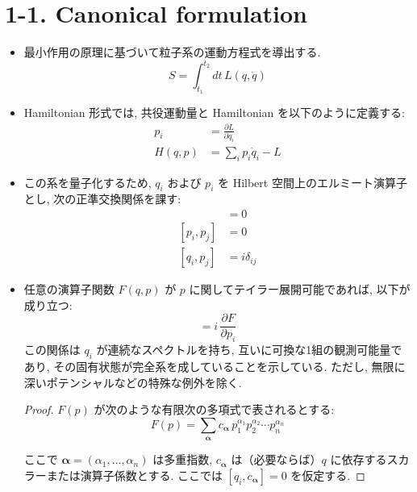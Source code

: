 \documentclass[a4paper,12pt]{article}
\begin{document}
\section*{1-1. Canonical formulation}

\begin{itemize}

    \item 最小作用の原理に基づいて粒子系の運動方程式を導出する.
      \begin{equation*}
      S = \int_{t_1}^{t_2} dt\, L(q, \dot{q}) \tag{1.1}
      \end{equation*}
    
    \item Hamiltonian 形式では, 共役運動量と Hamiltonian を以下のように定義する:
      \begin{align*}
      p_i &= \frac{\partial L}{\partial \dot{q}_i} \tag{1.2} \\
      H(q, p) &= \sum_i p_i \dot{q}_i - L 
      \end{align*}
    
    \item この系を量子化するため, $q_i$ および $p_i$ を Hilbert 空間上のエルミート演算子とし, 次の正準交換関係を課す:
      \begin{align*}
      [q_i, q_j] &= 0 \\
      [p_i, p_j] &= 0 \\
      [q_i, p_j] &= i \delta_{ij} \tag{1.3}
      \end{align*}
    
    \item 任意の演算子関数 $F(q, p)$ が $p$ に関してテイラー展開可能であれば, 以下が成り立つ:
      \begin{equation*}
      [q_i, F] = i\, \frac{\partial F}{\partial p_i} \tag{1.4}
      \end{equation*}
    この関係は $q_i$ が連続なスペクトルを持ち, 互いに可換な1組の観測可能量であり, その固有状態が完全系を成していることを示している. ただし, 無限に深いポテンシャルなどの特殊な例外を除く.

    \color{blue}
    \begin{proof}
    $F(p)$ が次のような有限次の多項式で表されるとする:
      \begin{equation*}
      F(p) = \sum_{\bm{\alpha}} c_{\bm{\alpha}}\, p_1^{\alpha_1} p_2^{\alpha_2} \cdots p_n^{\alpha_n} \tag{1-1.a1}
      \end{equation*}

    ここで $\bm{\alpha} = (\alpha_1, \ldots, \alpha_n)$ は多重指数, $c_{\bm{\alpha}}$ は（必要ならば）$q$ に依存するスカラーまたは演算子係数とする. ここでは $[q_i, c_{\bm{\alpha}}] = 0$ を仮定する.


\end{proof}
\end{itemize}
\end{document}
